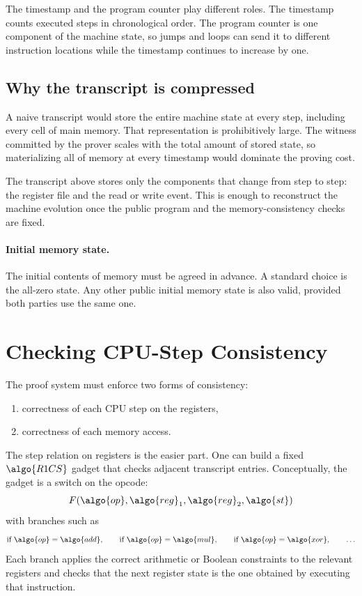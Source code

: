 \documentclass[11pt]{article}
\begin{document}
The timestamp and the program counter play different roles. The timestamp counts executed steps in chronological order. The program counter is one component of the machine state, so jumps and loops can send it to different instruction locations while the timestamp continues to increase by one.

\subsection{Why the transcript is compressed}

A naive transcript would store the entire machine state at every step, including every cell of main memory. That representation is prohibitively large. The witness committed by the prover scales with the total amount of stored state, so materializing all of memory at every timestamp would dominate the proving cost.

The transcript above stores only the components that change from step to step: the register file and the read or write event. This is enough to reconstruct the machine evolution once the public program and the memory-consistency checks are fixed.

\paragraph{Initial memory state.}
The initial contents of memory must be agreed in advance. A standard choice is the all-zero state. Any other public initial memory state is also valid, provided both parties use the same one.

\section{Checking CPU-Step Consistency}

The proof system must enforce two forms of consistency:
\begin{enumerate}
  \item correctness of each CPU step on the registers,
  \item correctness of each memory access.
\end{enumerate}

The step relation on registers is the easier part. One can build a fixed $\algo{R1CS}$ gadget that checks adjacent transcript entries. Conceptually, the gadget is a switch on the opcode:
\[
  F(\algo{op}, \algo{reg}_1, \algo{reg}_2, \algo{st})
\]
with branches such as
\[
  \text{if } \algo{op} = \algo{add}, \qquad
  \text{if } \algo{op} = \algo{mul}, \qquad
  \text{if } \algo{op} = \algo{xor}, \qquad \ldots
\]
Each branch applies the correct arithmetic or Boolean constraints to the relevant registers and checks that the next register state is the one obtained by executing that instruction.
\end{document}
